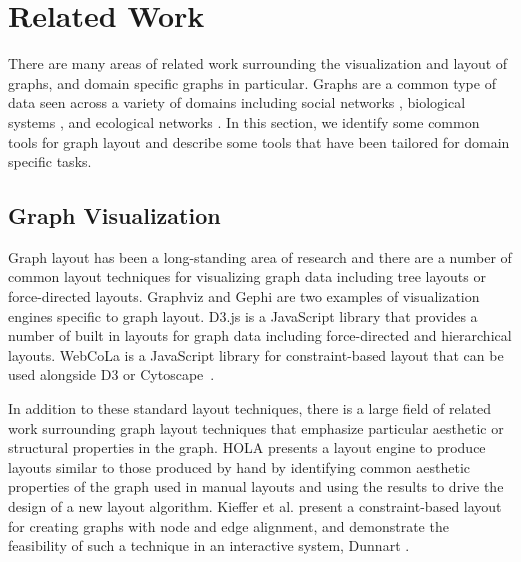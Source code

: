 \section{Related Work}
There are many areas of related work surrounding the visualization and layout of graphs, and domain specific graphs in particular. Graphs are a common type of data seen across a variety of domains including social networks \cite{scott1988social,travers1967small,granovetter1973strength,watts1998collective,freeman1978centrality}, biological systems \cite{barsky2008cerebral,shannon2003cytoscape,gehlenborg2010visualization,saraiya2005visualizing}, and ecological networks \cite{hinke2004visualizing,harper2006dynamic,lavigne1996cod,baskerville2011spatial,yodzis1998local,cohen2003ecological,kearney2016blog,benson2016higher}. In this section, we identify some common tools for graph layout and describe some tools that have been tailored for domain specific tasks.

\subsection{Graph Visualization}
Graph layout has been a long-standing area of research and there are a number of common layout techniques for visualizing graph data including tree layouts or force-directed layouts. Graphviz \cite{ellson2001graphviz} and Gephi \cite{bastian2009gephi} are two examples of visualization engines specific to graph layout. D3.js \cite{bostock:d3} is a JavaScript library that provides a number of built in layouts for graph data including force-directed and hierarchical layouts. WebCoLa \cite{WebCoLa} is a JavaScript library for constraint-based layout that can be used alongside D3 or Cytoscape~\cite{shannon2003cytoscape}.

In addition to these standard layout techniques, there is a large field of related work surrounding graph layout techniques that emphasize particular aesthetic or structural properties in the graph. HOLA \cite{kieffer2016hola} presents a layout engine to produce layouts similar to those produced by hand by identifying common aesthetic properties of the graph used in manual layouts and using the results to drive the design of a new layout algorithm. Kieffer et al. \cite{kieffer2013incremental} present a constraint-based layout for creating graphs with node and edge alignment, and demonstrate the feasibility of such a technique in an interactive system, Dunnart \cite{dwyer2008dunnart}.

